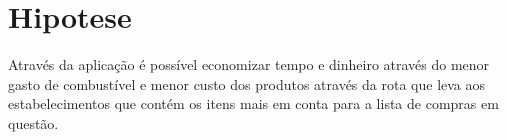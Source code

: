 
\section{Hipotese}
Através da aplicação é possível economizar tempo e dinheiro através
do menor gasto de combustível e menor custo dos produtos através da 
rota que leva aos estabelecimentos que contém os itens mais em conta
para a lista de compras em questão.